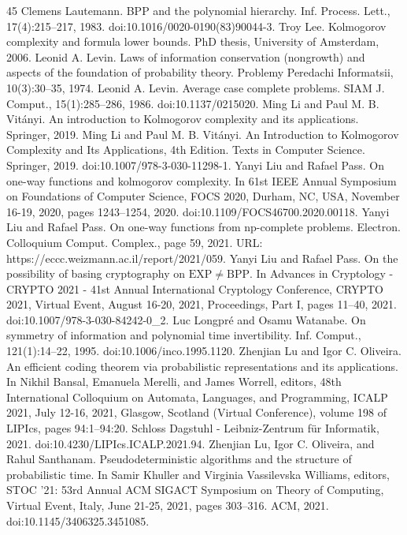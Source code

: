 \begin{thebibliography}{45}
 Clemens Lautemann. BPP and the polynomial hierarchy. Inf. Process. Lett., 17(4):215–217, 1983. doi:10.1016/0020-0190(83)90044-3.
 Troy Lee. Kolmogorov complexity and formula lower bounds. PhD thesis, University of Amsterdam, 2006.
 Leonid A. Levin. Laws of information conservation (nongrowth) and aspects of the foundation of probability theory. Problemy Peredachi Informatsii, 10(3):30–35, 1974.
 Leonid A. Levin. Average case complete problems. SIAM J. Comput., 15(1):285–286, 1986. doi:10.1137/0215020.
 Ming Li and Paul M. B. Vitányi. An introduction to Kolmogorov complexity and its applications. Springer, 2019.
 Ming Li and Paul M. B. Vitányi. An Introduction to Kolmogorov Complexity and Its Applications, 4th Edition. Texts in Computer Science. Springer, 2019. doi:10.1007/978-3-030-11298-1.
 Yanyi Liu and Rafael Pass. On one-way functions and kolmogorov complexity. In 61st IEEE Annual Symposium on Foundations of Computer Science, FOCS 2020, Durham, NC, USA, November 16-19, 2020, pages 1243–1254, 2020. doi:10.1109/FOCS46700.2020.00118.
 Yanyi Liu and Rafael Pass. On one-way functions from np-complete problems. Electron. Colloquium Comput. Complex., page 59, 2021. URL: https://eccc.weizmann.ac.il/report/2021/059.
 Yanyi Liu and Rafael Pass. On the possibility of basing cryptography on $\mathrm{EXP}\neq\mathrm{BPP}$. In Advances in Cryptology - CRYPTO 2021 - 41st Annual International Cryptology Conference, CRYPTO 2021, Virtual Event, August 16-20, 2021, Proceedings, Part I, pages 11–40, 2021. doi:10.1007/978-3-030-84242-0\_2.
 Luc Longpré and Osamu Watanabe. On symmetry of information and polynomial time invertibility. Inf. Comput., 121(1):14–22, 1995. doi:10.1006/inco.1995.1120.
 Zhenjian Lu and Igor C. Oliveira. An efficient coding theorem via probabilistic representations and its applications. In Nikhil Bansal, Emanuela Merelli, and James Worrell, editors, 48th International Colloquium on Automata, Languages, and Programming, ICALP 2021, July 12-16, 2021, Glasgow, Scotland (Virtual Conference), volume 198 of LIPIcs, pages 94:1–94:20. Schloss Dagstuhl - Leibniz-Zentrum für Informatik, 2021. doi:10.4230/LIPIcs.ICALP.2021.94.
 Zhenjian Lu, Igor C. Oliveira, and Rahul Santhanam. Pseudodeterministic algorithms and the structure of probabilistic time. In Samir Khuller and Virginia Vassilevska Williams, editors, STOC ’21: 53rd Annual ACM SIGACT Symposium on Theory of Computing, Virtual Event, Italy, June 21-25, 2021, pages 303–316. ACM, 2021. doi:10.1145/3406325.3451085.

\end{thebibliography}
